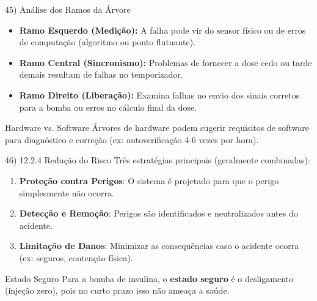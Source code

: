 \documentclass[aspectratio=169]{beamer}
\begin{document}
\begin{frame}{45) Análise dos Ramos da Árvore}
  \begin{itemize}
    \item \textbf{Ramo Esquerdo (Medição):} A falha pode vir do sensor físico ou de erros de computação (algoritmo ou ponto flutuante).
    \item \textbf{Ramo Central (Sincronismo):} Problemas de fornecer a dose cedo ou tarde demais resultam de falhas no temporizador.
    \item \textbf{Ramo Direito (Liberação):} Examina falhas no envio dos sinais corretos para a bomba ou erros no cálculo final da dose.
  \end{itemize}
  \vspace{0.4em}
  \begin{block}{Hardware vs. Software}
    Árvores de hardware podem sugerir requisitos de software para diagnóstico e correção (ex: autoverificação 4-6 vezes por hora).
  \end{block}
\end{frame}

\begin{frame}{46) 12.2.4 Redução do Risco}
  Três estratégias principais (geralmente combinadas):
  \vspace{0.5em}
  \begin{enumerate}
    \item \textbf{Proteção contra Perigos}: O sistema é projetado para que o perigo simplesmente não ocorra.
    \item \textbf{Detecção e Remoção}: Perigos são identificados e neutralizados antes do acidente.
    \item \textbf{Limitação de Danos}: Minimizar as consequências caso o acidente ocorra (ex: seguros, contenção física).
  \end{enumerate}
  \vspace{0.4em}
  \begin{alertblock}{Estado Seguro}
    Para a bomba de insulina, o \textbf{estado seguro} é o desligamento (injeção zero), pois no curto prazo isso não ameaça a saúde.
  \end{alertblock}
\end{frame}
\end{document}
